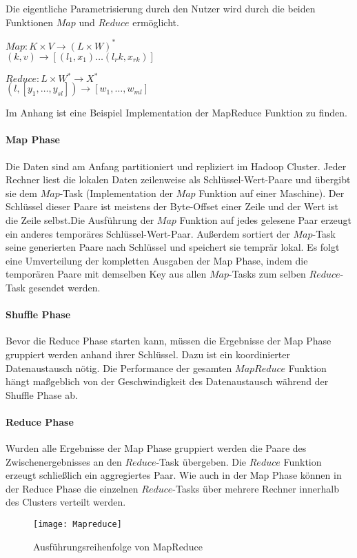 Die eigentliche Parametrisierung durch den Nutzer wird durch die beiden Funktionen $Map$ und $Reduce$ ermöglicht.

\begin{center}
    $Map: K \times V \rightarrow (L \times W)^\ast$\\$(k, v) \rightarrow [(l_1, x_1) \dots (l_rk, x_{rk})]$
\end{center}
\begin{center}
    $Reduce: L \times W^\ast \rightarrow X^\ast$\\$(l, [y_1, \dots, y_{sl}]) \rightarrow [w_1, \dots, w_{ml}]$
\end{center}

Im Anhang ist eine Beispiel Implementation der MapReduce Funktion zu finden.

\paragraph{Map Phase}$\;$ \\
Die Daten sind am Anfang partitioniert und repliziert im Hadoop Cluster. Jeder Rechner liest die lokalen Daten zeilenweise als Schlüssel-Wert-Paare und übergibt sie dem $Map$-Task (Implementation der $Map$ Funktion auf einer Maschine). Der Schlüssel dieser Paare ist meistens der Byte-Offset einer Zeile und der Wert ist die Zeile selbst.Die Ausführung der $Map$ Funktion auf jedes gelesene Paar erzeugt ein anderes temporäres Schlüssel-Wert-Paar. Außerdem sortiert der $Map$-Task seine generierten Paare nach Schlüssel und speichert sie temprär lokal. Es folgt eine Umverteilung der kompletten Ausgaben der Map Phase, indem die temporären Paare mit demselben Key aus allen $Map$-Tasks zum selben $Reduce$-Task gesendet werden.

\paragraph{Shuffle Phase}$\;$ \\
Bevor die Reduce Phase starten kann, müssen die Ergebnisse der Map Phase gruppiert werden anhand ihrer Schlüssel. Dazu ist ein koordinierter Datenaustausch nötig. Die Performance der gesamten $MapReduce$ Funktion hängt maßgeblich von der Geschwindigkeit des Datenaustausch während der Shuffle Phase ab.

\paragraph{Reduce Phase}$\;$ \\
Wurden alle Ergebnisse der Map Phase gruppiert werden die Paare des Zwischenergebnisses an den $Reduce$-Task übergeben. Die $Reduce$ Funktion erzeugt schließlich ein aggregiertes Paar. Wie auch in der Map Phase können in der Reduce Phase die einzelnen $Reduce$-Tasks über mehrere Rechner innerhalb des Clusters verteilt werden.

\begin{figure}
    \centering
    \texttt{[image: Mapreduce]}
    \caption{Ausführungsreihenfolge von MapReduce\cite{dg04}}
    \label{fig:mapreduce}
\end{figure}

